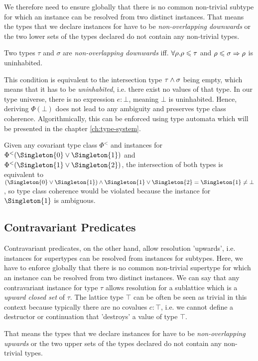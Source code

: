 We therefore need to ensure globally that there is no common non-trivial subtype for which an instance can be resolved from two distinct instances.
That means the types that we declare instances for have to be \emph{non-overlapping downwards} or the two lower sets of the types declared do not contain any non-trivial types.

\begin{definition}
  Two types $\tau$ and $\sigma$ are \emph{non-overlapping downwards} iff. $\forall\rho. \rho \leqslant \tau$ and $\rho \leqslant \sigma \Rightarrow \rho$ is uninhabited.
\end{definition}

This condition is equivalent to the intersection type $\tau \wedge \sigma$ being empty, which means that it has to be \emph{uninhabited}, i.e. there exist no values of that type.
In our type universe, there is no expression $e : \bot$, meaning $\bot$ is uninhabited.
Hence, deriving $\Phi(\bot)$ does not lead to any ambiguity and preserves type class coherence.
Algorithmically, this can be enforced using type automata which will be presented in the chapter \ref{ch:type-system}.

Given any covariant type class $\Phi^<$ and instances for $\Phi^<(\Singleton{0} \join \Singleton{1})$ and $\Phi^<(\Singleton{1} \join \Singleton{2})$,
the intersection of both types is equivalent to $(\Singleton{0} \join \Singleton{1}) \meet \Singleton{1} \join \Singleton{2} = \Singleton{1} \neq \bot$, so type class coherence would be violated because the instance for $\Singleton{1}$ is ambiguous.

\subsection{Contravariant Predicates}

Contravariant predicates, on the other hand, allow resolution 'upwards', i.e. instances for supertypes can be resolved from instances for subtypes.
Here, we have to enforce globally that there is no common non-trivial supertype for which an instance can be resolved from two distinct instances.
We can say that any contravariant instance for type $\tau$ allows resolution for a sublattice which is a \emph{upward closed set} of $\tau$. 
The lattice type $\top$ can be often be seen as trivial in this context because typically there are no covalues $c : \top$, i.e. we cannot define a destructor or continuation that 'destroys' a value of type $\top$.

That means the types that we declare instances for have to be \emph{non-overlapping upwards} or the two upper sets of the types declared do not contain any non-trivial types.

